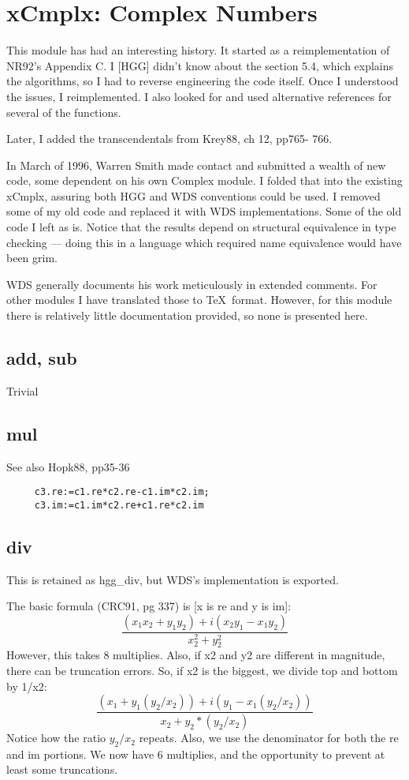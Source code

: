 \section{xCmplx: Complex Numbers}
This module has had an interesting history.  It started as a reimplementation
of NR92's Appendix C.  I [HGG] didn't know about the section 5.4, which
explains the algorithms, so I had to reverse engineering the code itself.
Once I understood the issues, I reimplemented.  I also looked for
and used alternative references for several of the functions.

Later, I added the transcendentals from Krey88, ch 12, pp765-
766. 

In March of 1996, Warren Smith made contact and submitted a wealth of
new code, some dependent on his own Complex module.  I folded that into
the existing xCmplx, assuring both HGG and WDS conventions could be used.
I removed some of my old code and replaced it with WDS implementations.
Some of the old code I left as is.  Notice that the results depend on
structural equivalence in type checking --- doing this in a language
which required name equivalence would have been grim. 

WDS generally documents his work meticulously in extended comments.  
For other modules I have translated those to \TeX\ format.  
However, for this
module there is relatively little documentation provided, so none is
presented here.

\subsection*{add, sub}
Trivial

\subsection*{mul}
See also Hopk88, pp35-36
\begin{verbatim}
     c3.re:=c1.re*c2.re-c1.im*c2.im;
     c3.im:=c1.im*c2.re+c1.re*c2.im
\end{verbatim}     


\subsection*{div}
This is retained as hgg\_div, but WDS's implementation is exported.

The basic formula (CRC91, pg 337) is [x is re and y is im]:
\begin{equation}
  \frac{(x_1x_2+y_1y_2) + i(x_2y_1-x_1y_2)}
       {x_2^2 + y_2^2}
\end{equation}
However, this takes 8 multiplies.  Also, if x2 and y2 are
different in magnitude, there can be truncation errors.  So,
if x2 is the biggest, we divide top and bottom by 1/x2:
\begin{equation}
  \frac{(x_1+y_1(y_2/x_2)) + i(y_1 - x_1(y_2/x_2))}
       {x_2 + y_2*(y_2/x_2)}
\end{equation}
Notice how the ratio $y_2/x_2$ repeats.  Also, we use the
denominator for both the re and im portions.  We now have 6
multiplies, and the opportunity to prevent at least some
truncations.

